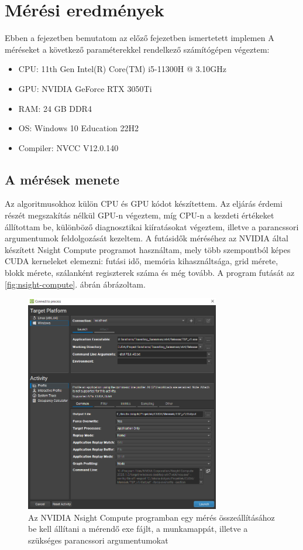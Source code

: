 \chapter{Mérési eredmények} \label{resultsChapter}
Ebben a fejezetben bemutatom az előző fejezetben ismertetett implemen
A méréseket a következő paraméterekkel rendelkező számítógépen végeztem:
\begin{itemize}
	\item	CPU: 11th Gen Intel(R) Core(TM) i5-11300H @ 3.10GHz
	\item	GPU: NVIDIA GeForce RTX 3050Ti 
	\item	RAM: 24 GB DDR4 
	\item	OS: Windows 10 Education 22H2 
	\item	Compiler: NVCC V12.0.140
	
\end{itemize}

\section{A mérések menete}
Az algoritmusokhoz külön CPU és GPU kódot készítettem. Az eljárás érdemi részét megszakítás nélkül GPU-n végeztem, míg CPU-n a kezdeti értékeket állítottam be, különböző diagnosztikai kiíratásokat végeztem, illetve a parancssori argumentumok feldolgozását kezeltem. A futásidők méréséhez az NVIDIA által készített Nsight Compute programot használtam, mely több szempontból képes CUDA kerneleket elemezni: futási idő, memória kihasználtsága, grid mérete, blokk mérete, szálanként regiszterek száma és még tovább. A program futását az \ref{fig:nsight-compute}. ábrán ábrázoltam. 

\begin{figure}[ht!]
	\centering
	\includegraphics[width=85mm, keepaspectratio]{figures/nsight-compute-config.png}
	\caption{Az NVIDIA Nsight Compute programban egy mérés összeállításához be kell állítani a mérendő exe fájlt, a munkamappát, illetve a szükséges parancssori argumentumokat}
	\label{fig:nsight-compute-config}
\end{figure}

